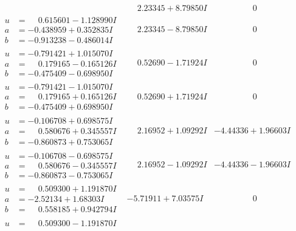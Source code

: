 \documentclass[1p]{elsarticle_modified}
\theoremstyle{definition}
\begin{document}
$$\begin{array}{c|c|c}
 & \phantom{-}2.23345 + 8.79850 I & \phantom{-0.000000 } 0 \\ \hline\begin{aligned}
u &= \phantom{-}0.615601 - 1.128990 I \\
a &= -0.438959 + 0.352835 I \\
b &= -0.913238 - 0.486014 I\end{aligned}
 & \phantom{-}2.23345 - 8.79850 I & \phantom{-0.000000 } 0 \\ \hline\begin{aligned}
u &= -0.791421 + 1.015070 I \\
a &= \phantom{-}0.179165 - 0.165126 I \\
b &= -0.475409 - 0.698950 I\end{aligned}
 & \phantom{-}0.52690 - 1.71924 I & \phantom{-0.000000 } 0 \\ \hline\begin{aligned}
u &= -0.791421 - 1.015070 I \\
a &= \phantom{-}0.179165 + 0.165126 I \\
b &= -0.475409 + 0.698950 I\end{aligned}
 & \phantom{-}0.52690 + 1.71924 I & \phantom{-0.000000 } 0 \\ \hline\begin{aligned}
u &= -0.106708 + 0.698575 I \\
a &= \phantom{-}0.580676 + 0.345557 I \\
b &= -0.860873 + 0.753065 I\end{aligned}
 & \phantom{-}2.16952 + 1.09292 I & -4.44336 + 1.96603 I \\ \hline\begin{aligned}
u &= -0.106708 - 0.698575 I \\
a &= \phantom{-}0.580676 - 0.345557 I \\
b &= -0.860873 - 0.753065 I\end{aligned}
 & \phantom{-}2.16952 - 1.09292 I & -4.44336 - 1.96603 I \\ \hline\begin{aligned}
u &= \phantom{-}0.509300 + 1.191870 I \\
a &= -2.52134 + 1.68303 I \\
b &= \phantom{-}0.558185 + 0.942794 I\end{aligned}
 & -5.71911 + 7.03575 I & \phantom{-0.000000 } 0 \\ \hline\begin{aligned}
u &= \phantom{-}0.509300 - 1.191870 I \\

\end{aligned}
\end{array}$$
\end{document}
